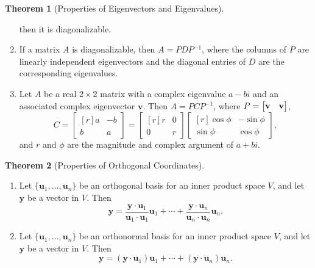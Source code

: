 \documentclass{myart}
\renewcommand{\vec}[1]{\ensuremath{\mathbf{#1}}}
\newcommand{\mat}[1]{\ensuremath{#1}}
\newcommand{\by}{\ensuremath{\times}}
\newcommand{\MAT}[2][r]{\ensuremath{\begin{bmatrix*}[#1]#2\end{bmatrix*}}}
\newcommand{\set}[1]{\ensuremath{\{#1\}}}
\newcommand{\inv}{\ensuremath{^{-1}}}
\newcommand{\many}[2][n]{\ensuremath{{#2}_1, \ldots, {#2}_{#1}}}
\let\Re\relax
\DeclareMathOperator{\Re}{Re}
\let\Im\relax
\DeclareMathOperator{\Im}{Im}
\newcommand{\dt}{\cdot}
\theoremstyle{definition}
\newtheorem{thm}{Theorem}
\begin{document}
\begin{thm}[Properties of Eigenvectors and Eigenvalues]
\begin{enumerate}
    then it is diagonalizable.
  \item If a matrix \mat A is diagonalizable, then $\mat A = \mat
    P\mat D\mat P\inv$, where the columns of \mat P are linearly
    independent eigenvectors and the diagonal entries of \mat D are
    the corresponding eigenvalues.
  \item Let \mat A be a real $2 \by 2$ matrix with a complex
    eigenvalue $a - bi$ and an associated complex eigenvector \vec v.
    Then $\mat A = \mat P\mat C\mat P\inv$, where $\mat P = \MAT{\Re
      \vec v & \Im \vec v}$,
    \begin{equation*}
      \mat C = \MAT{a & -b \\ b & a}
             = \MAT{r & 0 \\ 0 & r}
               \MAT{\cos \phi & -\sin \phi \\ \sin \phi & \cos \phi},
    \end{equation*}
    and $r$ and $\phi$ are the magnitude and complex argument of $a +
    bi$.
  \end{enumerate}
\end{thm}

\begin{thm}[Properties of Orthogonal Coordinates] \hfill
  \begin{enumerate}
  \item Let \set{\many{\vec u}} be an orthogonal basis for an inner
    product space $V$, and let \vec y be a vector in $V$. Then
    \begin{equation*}
      \vec y = \frac{\vec y \dt \vec u_1}{\vec u_1 \dt \vec u_1} \vec u_1
             + \cdots
             + \frac{\vec y \dt \vec u_n}{\vec u_n \dt \vec u_n} \vec u_n.
    \end{equation*}
  \item Let \set{\many{\vec u}} be an orthonormal basis for an inner
    product space $V$, and let \vec y be a vector in $V$. Then
    \begin{equation*}
      \vec y = (\vec y \dt \vec u_1) \vec u_1
             + \cdots
             + (\vec y \dt \vec u_n) \vec u_n.
    \end{equation*}
  \end{enumerate}
\end{thm}
\end{document}
